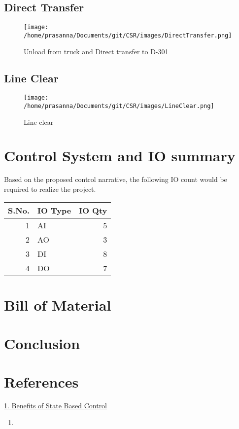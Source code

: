 \documentclass[a4paper,oneside]{article}
\begin{document}
\subsection{Direct Transfer}
\label{sec:org41aa648}
\begin{figure}[htbp]
\centering
\texttt{[image: /home/prasanna/Documents/git/CSR/images/DirectTransfer.png]}
\caption{Unload from truck and Direct transfer to D-301}
\end{figure}
\subsection{Line Clear}
\label{sec:orga0a1ed8}
\begin{figure}[htbp]
\centering
\texttt{[image: /home/prasanna/Documents/git/CSR/images/LineClear.png]}
\caption{Line clear}
\end{figure}
\section{Control System and IO summary}
\label{sec:org01f48c6}
Based on the proposed control narrative, the following IO count would be required to realize the project. 
\begin{center}
\begin{tabular}{rlr}
S.No. & IO Type & IO Qty\\
\hline
1 & AI & 5\\
2 & AO & 3\\
3 & DI & 8\\
4 & DO & 7\\
\end{tabular}
\end{center}

\section{Bill of Material}
\label{sec:org32c3b42}
\section{Conclusion}
\label{sec:org0cee532}
\section{References}
\label{sec:orgaf6efea}
\href{https://www.controlglobal.com/assets/knowledge\_centers/abb/assets/Benefits-of-state-based-control-white-paper.pdf}{1. Benefits of State Based Control}
\begin{enumerate}
\item 
\end{enumerate}
\end{document}
